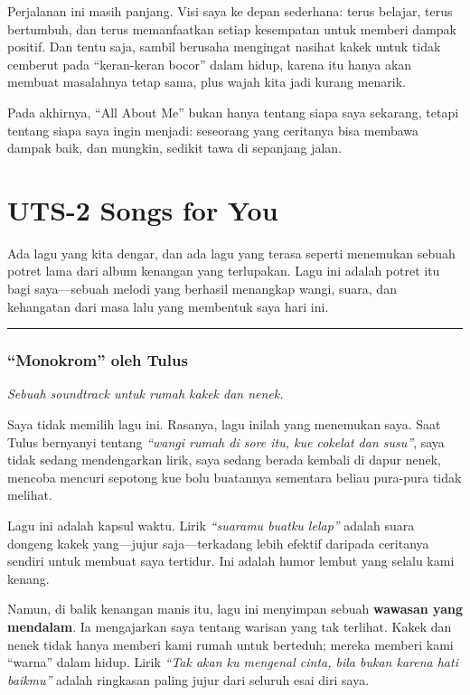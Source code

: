 \documentclass[
  letterpaper,
  DIV=11,
  numbers=noendperiod]{scrreprt}
\begin{document}
Perjalanan ini masih panjang. Visi saya ke depan sederhana: terus
belajar, terus bertumbuh, dan terus memanfaatkan setiap kesempatan untuk
memberi dampak positif. Dan tentu saja, sambil berusaha mengingat
nasihat kakek untuk tidak cemberut pada ``keran-keran bocor'' dalam
hidup, karena itu hanya akan membuat masalahnya tetap sama, plus wajah
kita jadi kurang menarik.

Pada akhirnya, ``All About Me'' bukan hanya tentang siapa saya sekarang,
tetapi tentang siapa saya ingin menjadi: seseorang yang ceritanya bisa
membawa dampak baik, dan mungkin, sedikit tawa di sepanjang jalan.


\chapter{UTS-2 Songs for You}\label{uts-2-songs-for-you}

Ada lagu yang kita dengar, dan ada lagu yang terasa seperti menemukan
sebuah potret lama dari album kenangan yang terlupakan. Lagu ini adalah
potret itu bagi saya---sebuah melodi yang berhasil menangkap wangi,
suara, dan kehangatan dari masa lalu yang membentuk saya hari ini.

\begin{center}\rule{0.5\linewidth}{0.5pt}\end{center}

\subsection{``Monokrom'' oleh Tulus}\label{monokrom-oleh-tulus}

\emph{Sebuah soundtrack untuk rumah kakek dan nenek.}

Saya tidak memilih lagu ini. Rasanya, lagu inilah yang menemukan saya.
Saat Tulus bernyanyi tentang \emph{``wangi rumah di sore itu, kue
cokelat dan susu''}, saya tidak sedang mendengarkan lirik, saya sedang
berada kembali di dapur nenek, mencoba mencuri sepotong kue bolu
buatannya sementara beliau pura-pura tidak melihat.

Lagu ini adalah kapsul waktu. Lirik \emph{``suaramu buatku lelap''}
adalah suara dongeng kakek yang---jujur saja---terkadang lebih efektif
daripada ceritanya sendiri untuk membuat saya tertidur. Ini adalah humor
lembut yang selalu kami kenang.

Namun, di balik kenangan manis itu, lagu ini menyimpan sebuah
\textbf{wawasan yang mendalam}. Ia mengajarkan saya tentang warisan yang
tak terlihat. Kakek dan nenek tidak hanya memberi kami rumah untuk
berteduh; mereka memberi kami ``warna'' dalam hidup. Lirik \emph{``Tak
akan ku mengenal cinta, bila bukan karena hati baikmu''} adalah
ringkasan paling jujur dari seluruh esai diri saya.
\end{document}
